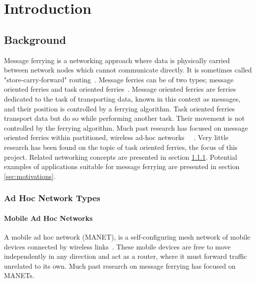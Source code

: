 
\chapter{Introduction} 

\section{Background}
Message ferrying is a networking approach where data is physically carried between network nodes which cannot communicate directly.
It is sometimes called "store-carry-forward" routing~\cite{Routing}.
Message ferries can be of two types; message oriented ferries and task oriented ferries~\cite{hybrid}.
Message oriented ferries are ferries dedicated to the task of transporting data, known in this context as messages, and their position is controlled by a ferrying algorithm.  
Task oriented ferries transport data but do so while performing another task.
Their movement is not controlled by the ferrying algorithm.
Much past research has focused on message oriented ferries within partitioned, wireless ad-hoc networks~\cite{Routing}~\cite{adhocmsgferry}	.
Very little research has been found on the topic of task oriented ferries, the focus of this project.
Related networking concepts are presented in section \ref{sec:net_types}.
Potential examples of applications suitable for message ferrying are presented in section \ref{sec:motivations}.


\subsection{Ad Hoc Network Types}
\label{sec:net_types}

\subsubsection{Mobile Ad Hoc Networks}
A mobile ad hoc network (MANET),  is a self-configuring mesh network of mobile devices connected by wireless links~\cite{book1}.
These mobile devices are free to move independently in any direction and act as a router, where it must forward traffic unrelated to its own.
Much past research on message ferrying has focused on MANETs.

